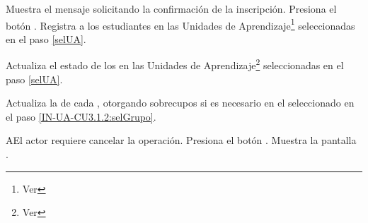 \begin{UCtrayectoria}
	\UCpaso Muestra el mensaje  solicitando la confirmación de la inscripción.
	\UCpaso[\UCactor]  \label{IN-UA-CU3.1.2:confirmar}Presiona el botón .
	\UCpaso Registra a los estudiantes en las Unidades de Aprendizaje\footnote{Ver } seleccionadas en el paso \ref{selUA}.
	
	\UCpaso Actualiza el estado de los  en las Unidades de Aprendizaje\footnote{Ver } seleccionadas en el paso \ref{selUA}.
	
	\UCpaso Actualiza la  de cada , otorgando sobrecupos si es necesario en el  seleccionado en el paso \ref{IN-UA-CU3.1.2:selGrupo}.
\end{UCtrayectoria}

\begin{UCtrayectoriaA}{A}{El actor requiere cancelar la operación.}
\UCpaso Presiona el botón .
\UCpaso Muestra la pantalla .
\end{UCtrayectoriaA}

